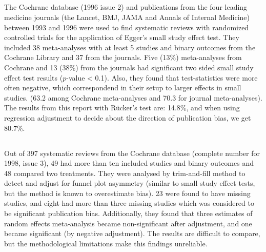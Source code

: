 \documentclass[11pt,a4paper,twoside]{book}\usepackage[]{graphicx}\usepackage[]{color}
\begin{document}
\subsection{\citet{Egger}}
The Cochrane database (1996 issue 2) and publications from the four leading medicine journals (the Lancet, BMJ, JAMA and Annals of Internal Medicine) between 1993 and 1996 were used to find systematic reviews with randomized controlled trials for the application of Egger's small study effect test. They included 38 meta-analyses with at least 5 studies and binary outcomes from the Cochrane Library and 37 from the journals. Five (13\%) meta-analyses from Cochrane and 13 (38\%) from the journals had significant two sided small study effect test results ($p$-value < 0.1). Also, they found that test-statistics were more often negative, which correspondend in their setup to larger effects in small studies. (63.2 among Cochrane meta-analyses and 70.3 for journal meta-analyses). The results from this report with R\"ucker's test are: 14.8\%, and when using regression adjustment to decide about the direction of publication bias, we get 80.7\%.


\subsection{\citet{sutton.2000}}
Out of 397 systematic reviews from the Cochrane database (complete number for 1998, issue 3), 49 had more than ten included studies and binary outcomes and 48 compared two treatments. They were analysed by trim-and-fill method \citep{trimfill} to detect and adjust for funnel plot asymmetry (similar to small study effect tests, but the method is known to overestimate bias). 23 were found to have missing studies, and eight had more than three missing studies which was considered to be significant publication bias. Additionally, they found that three estimates of random effects meta-analysis became non-significant after adjustment, and one became significant (by negative adjustment). The results are difficult to compare, but the methodological limitations make this findings unreliable.
\end{document}

